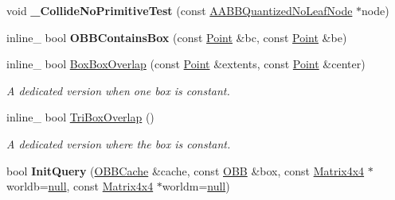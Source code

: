 \begin{DoxyCompactItemize}
\item 
void {\bfseries \+\_\+\+Collide\+No\+Primitive\+Test} (const \hyperlink{classAABBQuantizedNoLeafNode}{A\+A\+B\+B\+Quantized\+No\+Leaf\+Node} $\ast$node)\hypertarget{classOBBCollider_a2b02ebe38b171892c5b8372171b8a7bc}{}\label{classOBBCollider_a2b02ebe38b171892c5b8372171b8a7bc}

\item 
inline\+\_\+ bool {\bfseries O\+B\+B\+Contains\+Box} (const \hyperlink{classPoint}{Point} \&bc, const \hyperlink{classPoint}{Point} \&be)\hypertarget{classOBBCollider_a5cfea10cee5411ceb83f811a7d75ac47}{}\label{classOBBCollider_a5cfea10cee5411ceb83f811a7d75ac47}

\item 
inline\+\_\+ bool \hyperlink{classOBBCollider_a9e246a102b207fd70879cd6b3449356b}{Box\+Box\+Overlap} (const \hyperlink{classPoint}{Point} \&extents, const \hyperlink{classPoint}{Point} \&center)\hypertarget{classOBBCollider_a9e246a102b207fd70879cd6b3449356b}{}\label{classOBBCollider_a9e246a102b207fd70879cd6b3449356b}

\begin{DoxyCompactList}\small\item\em A dedicated version when one box is constant. \end{DoxyCompactList}\item 
inline\+\_\+ bool \hyperlink{classOBBCollider_a4fa9f517a822517a346559366545ceb3}{Tri\+Box\+Overlap} ()\hypertarget{classOBBCollider_a4fa9f517a822517a346559366545ceb3}{}\label{classOBBCollider_a4fa9f517a822517a346559366545ceb3}

\begin{DoxyCompactList}\small\item\em A dedicated version where the box is constant. \end{DoxyCompactList}\item 
bool {\bfseries Init\+Query} (\hyperlink{structOBBCache}{O\+B\+B\+Cache} \&cache, const \hyperlink{classOBB}{O\+BB} \&box, const \hyperlink{classMatrix4x4}{Matrix4x4} $\ast$worldb=\hyperlink{IceTypes_8h_ac97b8ee753e4405397a42ad5799b0f9e}{null}, const \hyperlink{classMatrix4x4}{Matrix4x4} $\ast$worldm=\hyperlink{IceTypes_8h_ac97b8ee753e4405397a42ad5799b0f9e}{null})\hypertarget{classOBBCollider_af81f1695a936b065f61add104fc4603a}{}\label{classOBBCollider_af81f1695a936b065f61add104fc4603a}

\end{DoxyCompactItemize}
